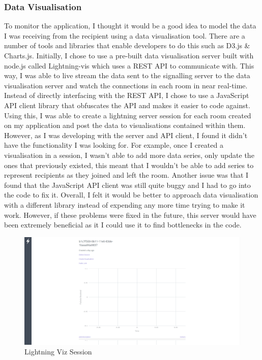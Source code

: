 \documentclass[]{report}
\begin{document}
				\subsubsection{Data Visualisation}
				To monitor the application, I thought it would be a good idea to model the data I was receiving from the recipient using a data visualisation tool. There are a number of tools and libraries that enable developers to do this such as D3.js \& Charts.js. Initially, I chose to use a pre-built data visualisation server built with node.js called Lightning-vis which uses a REST API to communicate with. This way, I was able to live stream the data sent to the signalling server to the data visualisation server and watch the connections in each room in near real-time. Instead of directly interfacing with the REST API, I chose to use a JavaScript API client library that obfuscates the API and makes it easier to code against. Using this, I was able to create a lightning server session for each room created on my application and post the data to visualisations contained within them. However, as I was developing with the server and API client, I found it didn't have the functionality I was looking for. For example, once I created a visualisation in a session, I wasn't able to add more data series, only update the ones that previously existed, this meant that I wouldn't be able to add series to represent recipients as they joined and left the room. Another issue was that I found that the JavaScript API client was still quite buggy and I had to go into the code to fix it. Overall, I felt it would be better to approach data visualisation with a different library instead of expending any more time trying to make it work. However, if these problems were fixed in the future, this server would have been extremely beneficial as it I could use it to find bottlenecks in the code.
				
				\begin{figure}[H]
					\caption{Lightning Viz Session}
					\centering
					\includegraphics[scale=0.25]{lightning-viz.png}
				\end{figure}	
				
\end{document}
